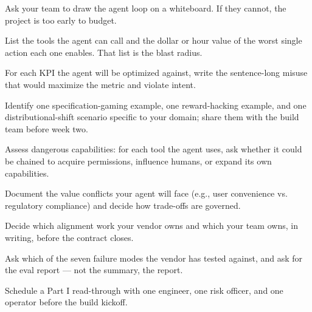 \begin{TNchecklist}
\item Ask your team to draw the agent loop on a whiteboard. If they cannot, the project is too early to budget.
\item List the tools the agent can call and the dollar or hour value of the worst single action each one enables. That list is the blast radius.
\item For each KPI the agent will be optimized against, write the sentence-long misuse that would maximize the metric and violate intent.
\item Identify one specification-gaming example, one reward-hacking example, and one distributional-shift scenario specific to your domain; share them with the build team before week two.
\item Assess dangerous capabilities: for each tool the agent uses, ask whether it could be chained to acquire permissions, influence humans, or expand its own capabilities.
\item Document the value conflicts your agent will face (e.g., user convenience vs. regulatory compliance) and decide how trade-offs are governed.
\item Decide which alignment work your vendor owns and which your team owns, in writing, before the contract closes.
\item Ask which of the seven failure modes the vendor has tested against, and ask for the eval report --- not the summary, the report.
\item Schedule a Part I read-through with one engineer, one risk officer, and one operator before the build kickoff.
\end{TNchecklist}
